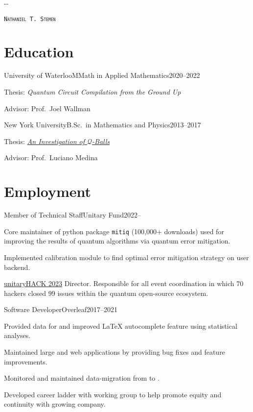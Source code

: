 \documentclass{cultvoucher}
\begin{document}
\begin{adjustwidth}{\dimexpr-\marginparsep-\marginparwidth}{}
	\begin{center}
		\textsc{\texttt{\HUGE Nathaniel T. Stemen}}

	\end{center}
\end{adjustwidth}

\section{Education}

\begin{entry}{University of Waterloo}{MMath in Applied Mathematics}{2020--2022}
	\item Thesis: \textit{Quantum Circuit Compilation from the Ground Up}
	\item Advisor: Prof.\ Joel Wallman
\end{entry}

\begin{entry}{New York University}{B.Sc.\ in Mathematics and Physics}{2013--2017}
	\item Thesis: \href{https://natestemen.xyz/qv-thesis.pdf}{\textit{An Investigation of $\mathcal{Q}$-Balls}}
	\item Advisor: Prof.\ Luciano Medina
\end{entry}

\section{Employment}

\begin{entry}{Member of Technical Staff}{Unitary Fund}{2022--}
	\item Core maintainer of python package \texttt{mitiq} (100,000+ downloads) used for improving the results of quantum algorithms via quantum error mitigation.
	\item Implemented calibration module to find optimal error mitigation strategy on user backend.
	\item \href{https://unitaryhack.dev/}{unitaryHACK 2023} Director. Responsible for all event coordination in which 70 hackers closed 99 issues within the quantum open-source ecosystem.
\end{entry}

\begin{entry}{Software Developer}{Overleaf}{2017--2021}
	\item Provided data for and improved \LaTeX{} autocomplete feature using statistical analyses.
	\item Maintained large  and  web applications by providing bug fixes and feature improvements.
	\item Monitored and maintained data-migration from  to .
	\item Developed career ladder with working group to help promote equity and continuity with growing company.
\end{entry}
\end{document}

